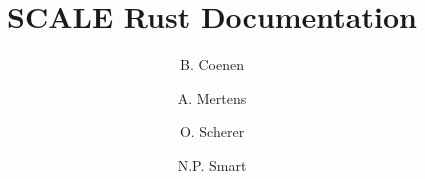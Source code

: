 \documentclass{article}
\begin{document}
\newcommand{\mainsection}[1]{\newpage \section{#1}}
\newcommand{\msubsection}[1]{\newpage \subsection{#1}}
\newcommand{\msubsubsection}[1]{\subsubsection{#1}}

\title{SCALE Rust Documentation}
\author{
B. Coenen
\and A. Mertens
\and O. Scherer
\and N.P. Smart}

\maketitle

\tableofcontents




















%
%
\end{document}
